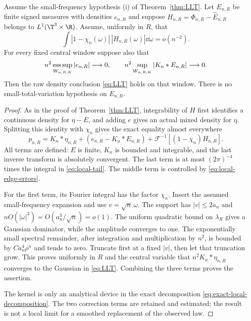 \begin{theorem}\label{thm:local-edge-LLT}
Assume the small-frequency hypothesis (i) of Theorem~\ref{thm:LLT}.
Let $E_{n,R}$ be finite signed measures with densities $e_{n,R}$ and
suppose $H_{n,R}=\Phi_{n,R}-\widehat E_{n,R}$ belongs to
$L^1(\T^3\times\R)$. Assume, uniformly in $R$, that
\begin{equation}\label{eq:local-tail}
 \int |1-\chi_n(\omega)|\,|H_{n,R}(\omega)|\dd\omega=o(n^{-2}).
\end{equation}
For every fixed central window suppose also that
\begin{equation}\label{eq:local-edge-errors}
 n^2\mathop{\rm ess\,sup}_{W_{n,R,K}}|e_{n,R}|\longrightarrow0,
 \qquad
 n^2\sup_{W_{n,R,K}}|K_n*E_{n,R}|\longrightarrow0.
\end{equation}
Then the raw density conclusion \eqref{eq:LLT} holds on that window.
There is no small-total-variation hypothesis on $E_{n,R}$.
\end{theorem}
\begin{proof}
As in the proof of Theorem~\ref{thm:LLT}, integrability of $H$ first
identifies a continuous density for $\eta-E$, and adding $e$ gives
an actual mixed density for $\eta$. Splitting this identity with
$\chi_n$ gives the exact equality almost everywhere
\begin{equation}\label{eq:exact-local-decomposition}
 p_{n,R}=K_n*\eta_{n,R}
       +(e_{n,R}-K_n*E_{n,R})
       +\mathcal F^{-1}[(1-\chi_n)H_{n,R}].
\end{equation}
All terms are defined: $E$ is finite, $K_n$ is bounded and integrable,
and the last inverse transform is absolutely convergent.
The last term is at most $(2\pi)^{-4}$ times the integral in
\eqref{eq:local-tail}. The middle term is controlled by
\eqref{eq:local-edge-errors}.

For the first term, its Fourier integral has the factor $\chi_n$.
Insert the assumed small-frequency expansion and use
$v=\sqrt n\,\omega$. The support has $|v|\le2a_n$ and
$nO(|\omega|^3)=O(a_n^3/\sqrt n)=o(1)$. The uniform quadratic
bound on $\lambda_R$ gives a Gaussian dominator, while the amplitude
converges to one. The exponentially small spectral remainder, after
integration and multiplication by $n^2$, is bounded by
$Ca_n^4\rho^n$ and tends to zero. Truncate first at a fixed $|v|$,
then let that truncation grow. This proves uniformly in $R$ and the
central variable that $n^2K_n*\eta_{n,R}$ converges to the Gaussian
in \eqref{eq:LLT}. Combining the three terms proves the assertion.

The kernel is only an analytical device in the exact decomposition
\eqref{eq:exact-local-decomposition}. The two correction terms are
retained and estimated; the result is not a local limit for a
smoothed replacement of the observed law.
\end{proof}

